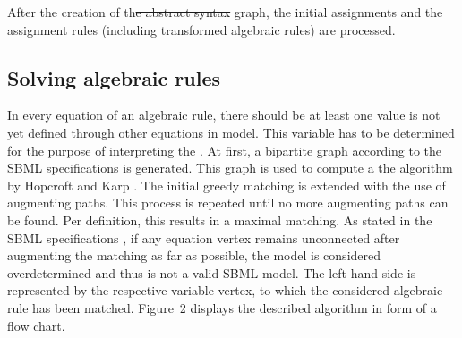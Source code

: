 \documentclass[10pt]{bmc_article}
\newenvironment{bmcformat}{\fussy\setboolean{publ}{true}}{\fussy}
\begin{document}
\begin{bmcformat}
After the creation of th\sout{e abstract syntax} graph, the initial
assignments and the assignment rules (including transformed algebraic rules) are
processed.


\subsection*{Solving algebraic rules}
In every equation of an algebraic rule, there should be at least one  value is not yet defined through other equations in  model. This variable has to be determined 
for the purpose of interpreting the . 
At first, a bipartite graph according to the \acs{SBML} specifications is generated. This graph is used to 
compute a  the algorithm by Hopcroft and Karp
\cite{hopcroft1973n}. The initial greedy matching is extended with the use of augmenting paths. This process is
repeated until no more augmenting paths can be found. Per definition, this results in a maximal matching. 
As stated in the \acs{SBML} specifications \cite{Finney2006, Hucka2007, Hucka2008, Hucka2010a}, if any equation vertex remains unconnected after augmenting the matching as far as possible, the model is considered overdetermined and thus is not a valid \acs{SBML} model.
The left-hand side is represented by the respective variable vertex, to which the considered algebraic rule has been matched.
Figure~2 displays the described algorithm in  form of a flow chart.



\end{bmcformat}
\end{document}
